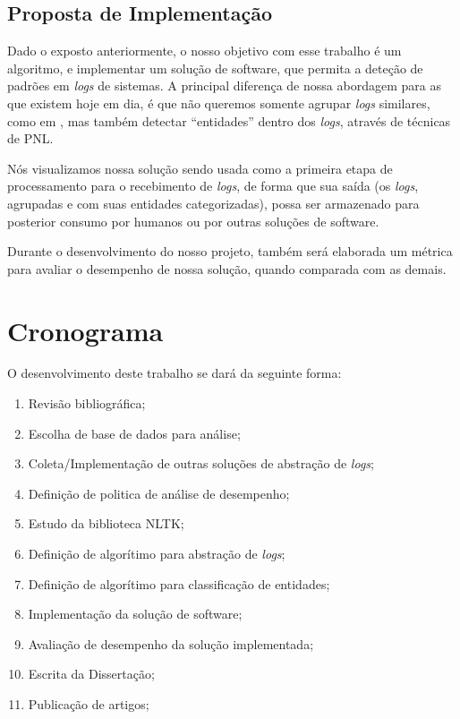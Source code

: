 \documentclass[
	12pt,				%
	openright,			%
	twoside,			%
	a4paper,			%
	english,			%
	spanish,			%
	brazil,				%
	]{abntex2}
\begin{document}
\section{Proposta de Implementação}\label{sec:implementacao}

Dado o exposto anteriormente, o nosso objetivo com esse trabalho é um algoritmo, e implementar um solução de software, que permita a deteção de padrões em \emph{logs} de sistemas. A principal diferença de nossa abordagem para as que existem hoje em dia, é que não queremos somente agrupar \emph{logs} similares, como em \cite{vaarandi2003data}, mas também detectar ``entidades'' dentro dos \emph{logs}, através de técnicas de PNL.

Nós visualizamos nossa solução sendo usada como a primeira etapa de processamento para o recebimento de \emph{logs}, de forma que sua saída (os \emph{logs}, agrupadas e com suas entidades categorizadas), possa ser armazenado para posterior consumo por humanos ou por outras soluções de software.

Durante o desenvolvimento do nosso projeto, também será elaborada um métrica para avaliar o desempenho de nossa solução, quando comparada com as demais.

\chapter{Cronograma}\label{chap:cronograma}
O desenvolvimento deste trabalho se dará da seguinte forma:

\begin{enumerate}
	\item \label{rev-bibli} Revisão bibliográfica;
	\item \label{esc-base} Escolha de base de dados para análise;
	\item \label{imp-outras} Coleta/Implementação de outras soluções de abstração de \emph{logs};
	\item \label{def-pol} Definição de politica de análise de desempenho;
	\item \label{est-nltk} Estudo da biblioteca NLTK;
	\item \label{algo-abs} Definição de algorítimo para abstração de \emph{logs};
	\item \label{algo-clas} Definição de algorítimo para classificação de entidades;
	\item \label{imp-sol} Implementação da solução de software;
	\item \label{ava-des} Avaliação de desempenho da solução implementada;
	\item \label{esc-dis} Escrita da Dissertação;
	\item \label{pub-art} Publicação de artigos;	
\end{enumerate}
\end{document}
